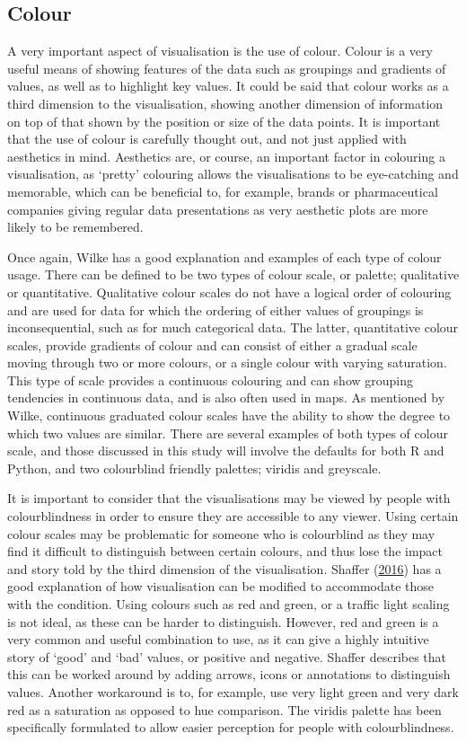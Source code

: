 \documentclass[
  11pt,
]{book}
\begin{document}
\subsection{Colour}

A very important aspect of visualisation is the use of colour. Colour is
a very useful means of showing features of the data such as groupings
and gradients of values, as well as to highlight key values. It could be
said that colour works as a third dimension to the visualisation,
showing another dimension of information on top of that shown by the
position or size of the data points. It is important that the use of
colour is carefully thought out, and not just applied with aesthetics in
mind. Aesthetics are, or course, an important factor in colouring a
visualisation, as `pretty' colouring allows the visualisations to be
eye-catching and memorable, which can be beneficial to, for example,
brands or pharmaceutical companies giving regular data presentations as
very aesthetic plots are more likely to be remembered.

Once again, Wilke has a good explanation and examples of each type of
colour usage. There can be defined to be two types of colour scale, or
palette; qualitative or quantitative. Qualitative colour scales do not
have a logical order of colouring and are used for data for which the
ordering of either values of groupings is inconsequential, such as for
much categorical data. The latter, quantitative colour scales, provide
gradients of colour and can consist of either a gradual scale moving
through two or more colours, or a single colour with varying saturation.
This type of scale provides a continuous colouring and can show grouping
tendencies in continuous data, and is also often used in maps. As
mentioned by Wilke, continuous graduated colour scales have the ability
to show the degree to which two values are similar. There are several
examples of both types of colour scale, and those discussed in this
study will involve the defaults for both R and Python, and two
colourblind friendly palettes; viridis and greyscale.

It is important to consider that the visualisations may be viewed by
people with colourblindness in order to ensure they are accessible to
any viewer. Using certain colour scales may be problematic for someone
who is colourblind as they may find it difficult to distinguish between
certain colours, and thus lose the impact and story told by the third
dimension of the visualisation. Shaffer
(\protect\hyperlink{ref-colourb}{2016}) has a good explanation of how
visualisation can be modified to accommodate those with the condition.
Using colours such as red and green, or a traffic light scaling is not
ideal, as these can be harder to distinguish. However, red and green is
a very common and useful combination to use, as it can give a highly
intuitive story of `good' and `bad' values, or positive and negative.
Shaffer describes that this can be worked around by adding arrows, icons
or annotations to distinguish values. Another workaround is to, for
example, use very light green and very dark red as a saturation as
opposed to hue comparison. The viridis palette has been specifically
formulated to allow easier perception for people with colourblindness.
\end{document}

